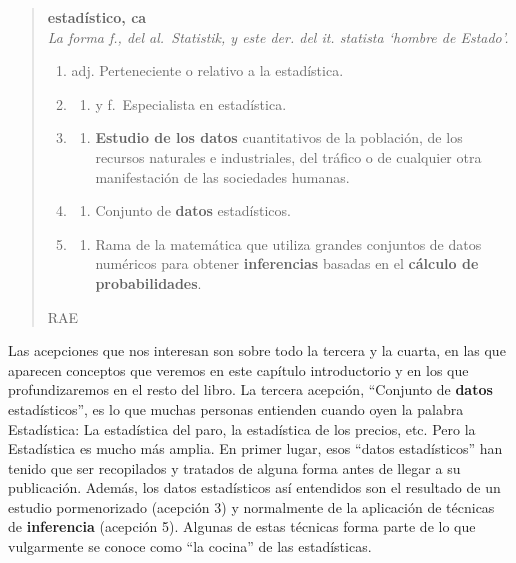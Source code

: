 \documentclass[
]{book}
\providecommand{\tightlist}{%
  \setlength{\itemsep}{0pt}\setlength{\parskip}{0pt}}
\begin{document}
\begin{quote}
\textbf{estadístico, ca}\\
\emph{La forma f., del al.~Statistik, y este der. del it. statista `hombre de Estado'.}

\begin{enumerate}
\def\labelenumi{\arabic{enumi}.}
\item
  adj. Perteneciente o relativo a la estadística.
\item
  \begin{enumerate}
  \def\labelenumii{\alph{enumii}.}
  \setcounter{enumii}{12}
  \tightlist
  \item
    y f.~Especialista en estadística.
  \end{enumerate}
\item
  \begin{enumerate}
  \def\labelenumii{\alph{enumii}.}
  \setcounter{enumii}{5}
  \tightlist
  \item
    \textbf{Estudio de los datos} cuantitativos de la población, de los recursos naturales e industriales, del tráfico o de cualquier otra manifestación de las sociedades humanas.
  \end{enumerate}
\item
  \begin{enumerate}
  \def\labelenumii{\alph{enumii}.}
  \setcounter{enumii}{5}
  \tightlist
  \item
    Conjunto de \textbf{datos} estadísticos.
  \end{enumerate}
\item
  \begin{enumerate}
  \def\labelenumii{\alph{enumii}.}
  \setcounter{enumii}{5}
  \tightlist
  \item
    Rama de la matemática que utiliza grandes conjuntos de datos numéricos para obtener \textbf{inferencias} basadas en el \textbf{cálculo de probabilidades}.
  \end{enumerate}
\end{enumerate}

RAE
\end{quote}

Las acepciones que nos interesan son sobre todo la tercera y la cuarta, en las
que aparecen conceptos
que veremos en este capítulo introductorio y en los que profundizaremos en el resto
del libro. La tercera acepción, ``Conjunto de \textbf{datos} estadísticos'', es lo que muchas
personas entienden cuando oyen la palabra Estadística: La estadística del paro,
la estadística de los precios, etc. Pero la Estadística es mucho más amplia.
En primer lugar, esos ``datos estadísticos'' han tenido que ser recopilados y
tratados de alguna forma antes de llegar a su publicación. Además, los datos
estadísticos así entendidos son el resultado de un estudio pormenorizado
(acepción 3) y normalmente de la aplicación de técnicas de \textbf{inferencia}
(acepción 5). Algunas de estas técnicas forma parte de lo que vulgarmente
se conoce como ``la cocina'' de las estadísticas.
\end{document}
